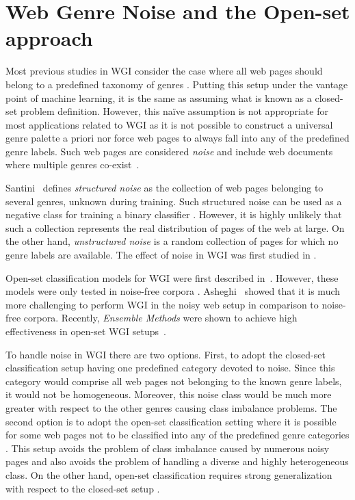 \section{Web Genre Noise and the Open-set approach}\label{chap:relevant_work:sec:intro}
Most previous studies in WGI consider the case where all web pages should belong to a predefined taxonomy of genres \cite{Lim2005,santini2007automatic,kanaris2009learning,jebari2014pure_URL}. Putting this setup under the vantage point of machine learning, it is the same as assuming what is known as a closed-set problem definition. However, this naïve assumption is not appropriate for most applications related to WGI as it is not possible to construct a universal genre palette a priori nor force web pages to always fall into any of the predefined genre labels. Such web pages are considered \textit{noise} and include web documents where multiple genres co-exist~\cite{santini2011cross,levering2008using}. 

Santini~\cite{santini2011cross} defines \textit{structured noise} as the collection of web pages belonging to several genres, unknown during training. Such structured noise can be used as a negative class for training a binary classifier \cite{Vidulin2007}. However, it is highly unlikely that such a collection represents the real distribution of pages of the web at large. On the other hand, \textit{unstructured noise} is a random collection of pages \cite{santini2011cross} for which no genre labels are available. The effect of noise in WGI was first studied in \cite{shepherd2004cybergenre,kennedy2005automatic,dong2006binary,levering2008using}.

Open-set classification models for WGI were first
described in~\cite{pritsos2013open,stubbe2007genre}. However, these models were only tested in noise-free corpora \cite{pritsos2015clef}. Asheghi~\cite{Asheghi2015} showed that it is much more challenging to perform WGI
in the noisy web setup in comparison to noise-free corpora. Recently, \textit{Ensemble Methods} were shown to achieve high effectiveness in open-set WGI setups~\cite{pritsos2018open}.


To handle noise in WGI there are two options. First, to adopt the closed-set classification setup having one predefined category devoted to noise. Since this category would comprise all web pages not belonging to the known genre labels, it would not be homogeneous. Moreover, this noise class would be much more greater with respect to the other genres causing class imbalance problems. The second option is to adopt the open-set classification setting where it is possible for some web pages not to be classified into any of the predefined genre categories \parencite{pritsos2013open}. This setup avoids the problem of class imbalance caused by numerous noisy pages and also avoids the problem of handling a diverse and highly heterogeneous class. On the other hand, open-set classification requires strong generalization with respect to the closed-set setup \parencite{scheirer2013toward}.

